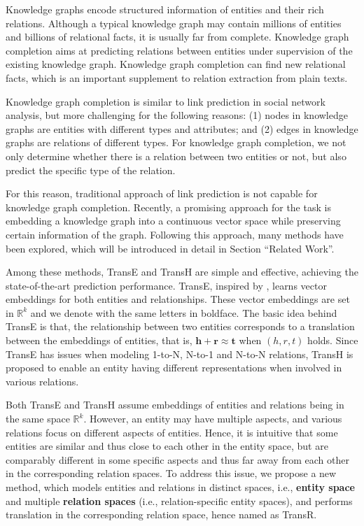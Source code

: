   Knowledge graphs encode structured information of entities and their rich relations. Although a typical knowledge graph may contain millions of entities and billions of relational facts, it is usually far from complete. Knowledge graph completion aims at predicting relations between entities under supervision of the existing knowledge graph. Knowledge graph completion can find new relational facts, which is an important supplement to relation extraction from plain texts.

  Knowledge graph completion is similar to link prediction in social network analysis, but more challenging for the following reasons: (1) nodes in knowledge graphs are entities with different types and attributes; and (2) edges in knowledge graphs are relations of different types. For knowledge graph completion, we not only determine whether there is a relation between two entities or not, but also predict the specific type of the relation.

  For this reason, traditional approach of link prediction is not capable for knowledge graph completion. Recently, a promising approach for the task is embedding a knowledge graph into a continuous vector space while preserving certain information of the graph. Following this approach, many methods have been explored, which will be introduced in detail in Section ``Related Work''.

  Among these methods, TransE  and TransH  are simple and effective, achieving the state-of-the-art prediction performance. TransE, inspired by , learns vector embeddings for both entities and relationships. These vector embeddings are set in $\mathbb{R}^k$ and we denote  with the same letters in boldface. The basic idea behind TransE is that, the relationship between two entities corresponds to a translation between the embeddings of entities, that is, $\mathbf{h} + \mathbf{r} \approx \mathbf{t}$ when $(h, r, t)$ holds. Since TransE has issues when modeling 1-to-N, N-to-1 and N-to-N relations, TransH is proposed to enable an entity having different representations when involved in various relations.

  Both TransE and TransH assume embeddings of entities and relations being in the same space $\mathbb{R}^k$. However, an entity may have multiple aspects, and various relations focus on different aspects of entities. Hence, it is intuitive that some entities are similar and thus close to each other in the entity space, but are comparably different in some specific aspects and thus far away from each other in the corresponding relation spaces. To address this issue, we propose a new method, which models entities and relations in distinct spaces, i.e., \textbf{entity space} and multiple \textbf{relation spaces} (i.e., relation-specific entity spaces), and performs translation in the corresponding relation space, hence named as TransR.

